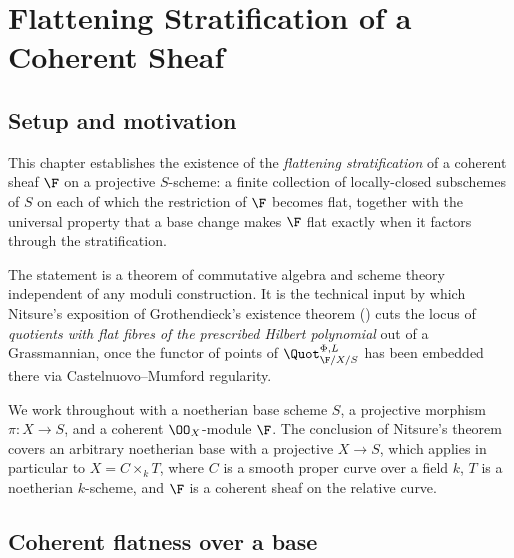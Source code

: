 \chapter{Flattening Stratification of a Coherent Sheaf}
\label{chap:Picard_FlatteningStratification}

\section{Setup and motivation}
\label{sec:flatstrat_setup}

This chapter establishes the existence of the \emph{flattening stratification} of
a coherent sheaf \(\F\) on a projective \(S\)-scheme: a finite collection of
locally-closed subschemes of \(S\) on each of which the restriction of \(\F\)
becomes flat, together with the universal property that a base change makes
\(\F\) flat exactly when it factors through the stratification.

The statement is a theorem of commutative algebra and scheme theory
independent of any moduli construction.  It is the technical input by which
Nitsure's exposition of Grothendieck's existence theorem
(\cite[\S5]{nitsure-hilbert-quot}) cuts the locus of \emph{quotients with flat
fibres of the prescribed Hilbert polynomial} out of a Grassmannian, once the
functor of points of \(\Quot_{\F/X/S}^{\Phi,L}\) has been embedded there via
Castelnuovo--Mumford regularity.

We work throughout with a noetherian base scheme \(S\), a projective morphism
\(\pi : X \to S\), and a coherent \(\OO_X\)-module \(\F\). The conclusion of Nitsure's
theorem covers an arbitrary noetherian base with a projective \(X \to S\), which
applies in particular to \(X = C \times_k T\), where \(C\) is a smooth proper
curve over a field \(k\), \(T\) is a noetherian \(k\)-scheme, and \(\F\) is a
coherent sheaf on the relative curve.

\section{Coherent flatness over a base}
\label{sec:coh_flat}

